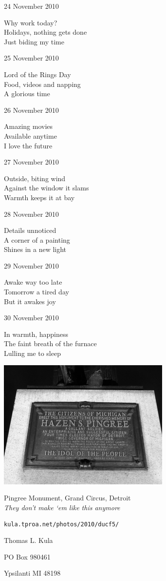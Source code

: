 \documentclass[12pt]{article}
\begin{document}
24 November 2010

Why work today? \\
Holidays, nothing gets done \\
Just biding my time

25 November 2010

Lord of the Rings Day \\
Food, videos and napping \\
A glorious time

26 November 2010

Amazing movies \\
Available anytime \\
I love the future

27 November 2010

Outside, biting wind \\
Against the window it slams \\
Warmth keeps it at bay

28 November 2010

Details unnoticed \\
A corner of a painting \\
Shines in a new light

29 November 2010

Awake way too late \\
Tomorrow a tired day \\
But it awakes joy

30 November 2010

In warmth, happiness \\
The faint breath of the furnace \\
Lulling me to sleep


\newpage

\begin{center}
\includegraphics{monument.png}

Pingree Monument, Grand Circus, Detroit \\
{\em They don't make `em like this anymore}

\small{{\tt kula.tproa.net/photos/2010/ducf5/ }}
\end{center}


\newpage

\thispagestyle{empty}
\vspace*{14cm}
\begin{sideways}
\Large{Thomas L. Kula}
\end{sideways}
\begin{sideways}
\Large{PO Box 980461}
\end{sideways}
\begin{sideways}
\Large{Ypsilanti MI 48198}
\end{sideways}
\end{document}
